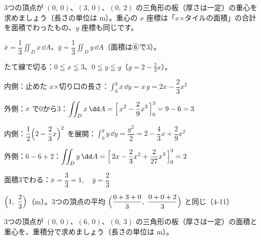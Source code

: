 \begin{reidai}[三角形の板の重心]
3つの頂点が $(0,\ 0)$、$(3,\ 0)$、$(0,\ 2)$ の三角形の板（厚さは一定）の重心を求めましょう（長さの単位は m）。重心の $x$ 座標は「$x$×タイルの面積」の合計を面積でわったもの、$y$ 座標も同じです。\par
\kangaekata {}\par
{}\enspace $\bar x=\dfrac{1}{3}\iint_D x\,\dd A$、$\bar y=\dfrac{1}{3}\iint_D y\,\dd A$（面積は⑥で3）。\par
{}\enspace たて線で切る：$0\leqq x\leqq3$、$0\leqq y\leqq g$（$g=2-\tfrac{2}{3}x$）。\par
\shiki\kviiigs{}\zw{} 内側：止めた $x$×切り口の長さ：$\displaystyle \int_0^{g}x\,\dd y=x\,g=2x-\dfrac{2}{3}x^2$\par
\kviiiga 外側：$x$ で0から3：$\displaystyle \iint_D x\,\dd A=\Bigl[\,x^2-\dfrac{2}{9}x^3\,\Bigr]_0^3=9-6=3$\par
\kviiiga 内側：$\dfrac12\Bigl(2-\dfrac23x\Bigr)^2$ を展開：$\displaystyle \int_0^{g}y\,\dd y=\dfrac{g^2}{2}=2-\dfrac{4}{3}x+\dfrac{2}{9}x^2$\par
\kviiiga 外側：$6-6+2$：$\displaystyle \iint_D y\,\dd A=\Bigl[\,2x-\dfrac{2}{3}x^2+\dfrac{2}{27}x^3\,\Bigr]_0^3=2$\par
\kviiiga 面積3でわる：$\displaystyle \bar x=\dfrac{3}{3}=1,\quad \bar y=\dfrac{2}{3}$\par
\kotae $\Bigl(1,\ \dfrac{2}{3}\Bigr)$（m）。3つの頂点の平均 $\Bigl(\dfrac{0+3+0}{3},\ \dfrac{0+0+2}{3}\Bigr)$ と同じ（4-11）\par
{}
\end{reidai}

\begin{jibun}
3つの頂点が $(0,\ 0)$、$(6,\ 0)$、$(0,\ 3)$ の三角形の板（厚さは一定）の面積と重心を、重積分で求めましょう（長さの単位は m）。
\end{jibun}

